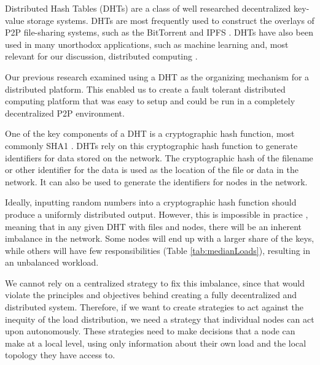 \documentclass[10pt,conference]{IEEEtran}
\begin{document}

Distributed Hash Tables (DHTs) are a class of well researched decentralized key-value storage systems.
DHTs are most frequently used to construct the overlays of P2P file-sharing systems, such as the BitTorrent \cite{bittorrent} and IPFS \cite{benet2014ipfs}.
DHTs have also been used in many unorthodox applications, such as machine learning \cite{liparameter} and, most relevant for our discussion, distributed computing  \cite{marozzo2012p2p} \cite{leemap}.



Our previous research \cite{chordreduce} examined using a DHT as the organizing mechanism for a distributed platform.
This enabled us to create a fault tolerant distributed computing platform that was easy to setup and could be run in a completely decentralized P2P environment.

One of the key components of a DHT is a cryptographic hash function, most commonly SHA1 \cite{sha1}.
DHTs rely on this cryptographic hash function to generate identifiers for data stored on the network.
The cryptographic hash of the filename or other identifier for the data is used as the location of the file or data in the network.
It can also be used to generate the identifiers for nodes in the network.

Ideally, inputting random numbers into a cryptographic hash function should produce a uniformly distributed output.
However, this is impossible in practice \cite{hash-outputs} \cite{thomsen2005cryptographic}, meaning that in any given DHT with files and nodes, there will be an inherent imbalance in the network.
Some nodes will end up with a larger share of the keys, while others will have few responsibilities (Table \ref{tab:medianLoads}), resulting in an unbalanced workload.

We cannot rely on a centralized strategy to fix this imbalance, since that would violate the principles and objectives behind creating a fully decentralized and distributed system.
Therefore, if we want to create strategies to act against the inequity of the load distribution, we need a strategy that individual nodes can act upon autonomously.
These strategies need to make decisions that a node can make at a local level, using only information about their own load and the local topology they have access to.
\end{document}
